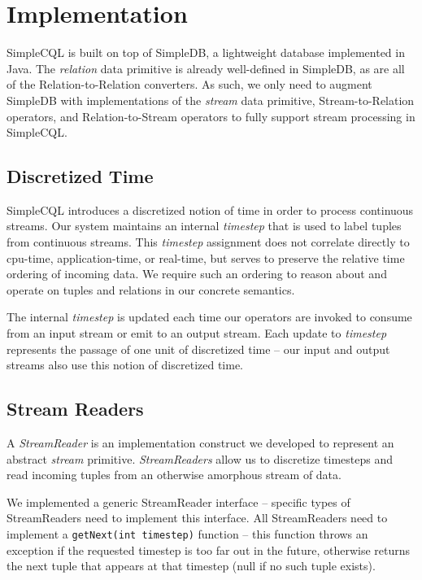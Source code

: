 \documentclass[a4paper, 10pt, conference]{IEEEconf}
\begin{document}
\section{Implementation}
SimpleCQL is built on top of SimpleDB, a lightweight database implemented in Java. The \textit{relation} data primitive is already well-defined in SimpleDB, as are all of the Relation-to-Relation converters. As such, we only need to augment SimpleDB with implementations of the \textit{stream} data primitive, Stream-to-Relation operators, and Relation-to-Stream operators to fully support stream processing in SimpleCQL. 

\subsection*{Discretized Time}
SimpleCQL introduces a discretized notion of time in order to process continuous streams. Our system maintains an internal \textit{timestep} that is used to label tuples from continuous streams. This \textit{timestep} assignment does not correlate directly to cpu-time, application-time, or real-time, but serves to preserve the relative time ordering of incoming data. We require such an ordering to reason about and operate on tuples and relations in our concrete semantics.

The internal \textit{timestep} is updated each time our operators are invoked to consume from an input stream or emit to an output stream. Each update to \textit{timestep} represents the passage of one unit of discretized time -- our input and output streams also use this notion of discretized time. 

\subsection{Stream Readers}
A \textit{StreamReader} is an implementation construct we developed to represent an abstract \textit{stream} primitive. \textit{StreamReaders} allow us to discretize timesteps and read incoming tuples from an otherwise amorphous stream of data.

We implemented a generic StreamReader interface -- specific types of StreamReaders need to implement this interface. All StreamReaders need to implement a \texttt{getNext(int timestep)} function -- this function throws an exception if the requested timestep is too far out in the future, otherwise returns the next tuple that appears at that timestep (null if no such tuple exists).
\end{document}
